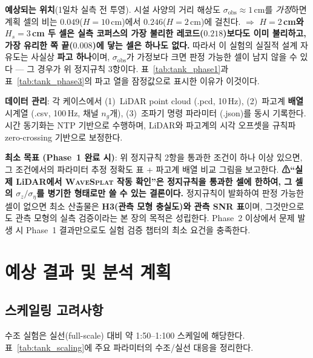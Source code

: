\documentclass[11pt]{report}
\numberwithin{equation}{chapter}
\numberwithin{figure}{chapter}
\numberwithin{table}{chapter}
\newcommand{\WS}{\textsc{WaveSplat}}
\begin{document}
\textbf{예상되는 위치}(1일차 실측 전 투영). 시설 사양의 거리 해상도
$\sigma_{\text{obs}} \approx 1$\,cm를 \emph{가정}하면 계획 셀의 비는
$0.049$($H = 10$\,cm)에서 $0.246$($H = 2$\,cm)에 걸친다.
$\Rightarrow$ \textbf{$H = 2$\,cm와 $H_s = 3$\,cm 두 셀은 실측 코퍼스의 가장 불리한
레코드($0.218$)보다도 이미 불리하고, 가장 유리한 쪽 끝($0.008$)에 닿는 셀은 하나도 없다.}
따라서 이 실험의 실질적 설계 자유도는 사실상 \textbf{파고 하나}이며,
$\sigma_{\text{obs}}$가 가정보다 크면 판정 가능한 셀이 남지 않을 수 있다 ---
그 경우가 위 정지규칙 3항이다. 표~\ref{tab:tank_phase1}과 표~\ref{tab:tank_phase3}의
파고 열을 잠정값으로 표시한 이유가 이것이다.

\textbf{데이터 관리}:
각 케이스에서 (1)~LiDAR point cloud (.pcd, 10\,Hz),
(2)~파고계 \textbf{배열} 시계열 (.csv, 100\,Hz, 채널 $n_g$개),
(3)~조파기 명령 파라미터 (.json)를 동시 기록한다.
시간 동기화는 NTP 기반으로 수행하며,
LiDAR와 파고계의 시각 오프셋을 규칙파 zero-crossing 기반으로 보정한다.

\textbf{최소 목표 (Phase~1 완료 시)}:
위 정지규칙 2항을 통과한 조건이 하나 이상 있으면,
그 조건에서의 파라미터 추정 정확도 표 + 파고계 배열 비교 그림을 보고한다.
\textbf{⚠``실제 LiDAR에서 \WS{} 작동 확인''은 정지규칙을 통과한 셀에 한하여,
그 셀의 $\sigma_z/\sigma_\eta$를 병기한 형태로만 쓸 수 있는 결론이다.}
정지규칙이 발화하여 판정 가능한 셀이 없으면 최소 산출물은
\textbf{H3(관측 모형 충실도)와 관측 SNR 표}이며, 그것만으로도
관측 모형의 실측 검증이라는 본 장의 목적은 성립한다.
Phase~2 이상에서 문제 발생 시 Phase~1 결과만으로도
실험 검증 챕터의 최소 요건을 충족한다.

\section{예상 결과 및 분석 계획}
\label{sec:tank_expected}

\subsection{스케일링 고려사항}

수조 실험은 실선(full-scale) 대비 약 1:50--1:100 스케일에 해당한다.
표~\ref{tab:tank_scaling}에 주요 파라미터의 수조/실선 대응을 정리한다.
\end{document}
